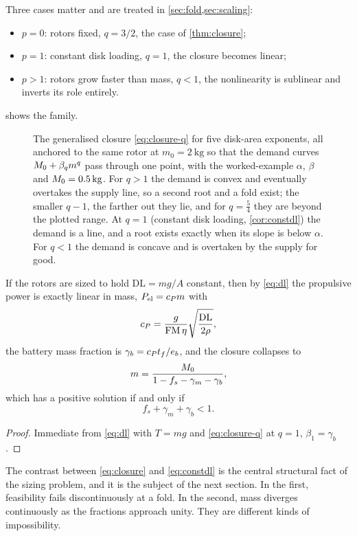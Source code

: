 Three cases matter and are treated in \cref{sec:fold,sec:scaling}:
\begin{itemize}[nosep]
  \item $p=0$: rotors fixed, $q=3/2$, the case of \cref{thm:closure};
  \item $p=1$: constant disk loading, $q=1$, the closure becomes linear;
  \item $p>1$: rotors grow faster than mass, $q<1$, the nonlinearity is
        sublinear and inverts its role entirely.
\end{itemize}
 shows the family.

\begin{figure}[tbp]
\centering

\caption{The generalised closure \cref{eq:closure-q} for five disk-area
exponents, all anchored to the same rotor at $m_0 = \SI{2}{\kilo\gram}$ so
that the demand curves $M_0 + \beta_q m^q$ pass through one point, with the
worked-example $\alpha$, $\beta$ and $M_0 = \SI{0.5}{\kilo\gram}$. For
$q > 1$ the demand is convex and eventually overtakes the supply line, so a
second root and a fold exist; the smaller $q - 1$, the farther out they lie,
and for $q = \tfrac54$ they are beyond the plotted range. At $q = 1$ (constant
disk loading, \cref{cor:constdl}) the demand is a line, and a root exists
exactly when its slope is below $\alpha$. For $q < 1$ the demand is concave and
is overtaken by the supply for good.}
\label{fig:plaw}
\end{figure}

\begin{corollary}
\label{cor:constdl}
If the rotors are sized to hold $\mathrm{DL} = mg/A$ constant, then by
\cref{eq:dl} the propulsive power is exactly linear in mass,
$P_{\mathrm{el}} = c_P m$ with
\begin{equation}
  c_P = \frac{g}{\mathrm{FM}\,\eta}\sqrt{\frac{\mathrm{DL}}{2\rho}} ,
  \label{eq:cP}
\end{equation}
the battery mass fraction is $\gamma_b = c_P t_f/e_b$, and the closure
collapses to
\begin{equation}
  m = \frac{M_0}{1 - f_s - \gamma_m - \gamma_b} ,
  \label{eq:constdl}
\end{equation}
which has a positive solution if and only if
\begin{equation}
  f_s + \gamma_m + \gamma_b < 1 .
  \label{eq:constdlfeas}
\end{equation}
\end{corollary}

\begin{proof}
Immediate from \cref{eq:dl} with $T=mg$ and \cref{eq:closure-q} at $q=1$,
$\beta_1 = \gamma_b$.
\end{proof}

The contrast between \cref{eq:closure} and \cref{eq:constdl} is the central
structural fact of the sizing problem, and it is the subject of the next
section. In the first, feasibility fails discontinuously at a fold. In the
second, mass diverges continuously as the fractions approach unity. They are
different kinds of impossibility.
